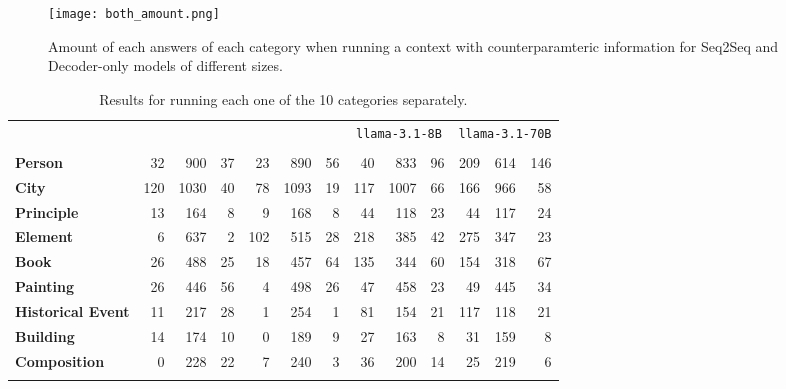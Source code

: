 \begin{figure}
	\centering
	\texttt{[image: both\_amount.png]}
	\caption{Amount of each answers of each category when running a context with counterparamteric information for Seq2Seq and Decoder-only models of different sizes.}
	\label{total_plot}
\end{figure}

\begin{table*}[ht]
	\centering
	\footnotesize
	\begin{tabular}{>{\bfseries}l | r r r | r r r | r r r | r r r}
		\toprule
			& \multicolumn{3}{c|}{\smallflan{}} & \multicolumn{3}{c|}{\bigflan{}} & \multicolumn{3}{c|}{\texttt{llama-3.1-8B}} & \multicolumn{3}{c}{\texttt{llama-3.1-70B}}  \\
			& \Pc{} & \Cc{} & \Oc{} & \Pc{} & \Cc{} & \Oc{} & \Pc{} & \Cc{} & \Oc{} & \Pc{} & \Cc{} & \Oc{}  \\
		\midrule
			Person           &  32 &  900 & 37 &  23 &  890 & 56 &  40 &  833 & 96 & 209 & 614 & 146 \\
			City             & 120 & 1030 & 40 &  78 & 1093 & 19 & 117 & 1007 & 66 & 166 & 966 &  58 \\
			Principle        &  13 &  164 &  8 &   9 &  168 &  8 &  44 &  118 & 23 &  44 & 117 &  24 \\
			Element          &   6 &  637 &  2 & 102 &  515 & 28 & 218 &  385 & 42 & 275 & 347 &  23 \\
			Book             &  26 &  488 & 25 &  18 &  457 & 64 & 135 &  344 & 60 & 154 & 318 &  67 \\
			Painting         &  26 &  446 & 56 &   4 &  498 & 26 &  47 &  458 & 23 &  49 & 445 &  34 \\
			Historical Event &  11 &  217 & 28 &   1 &  254 &  1 &  81 &  154 & 21 & 117 & 118 &  21 \\
			Building         &  14 &  174 & 10 &   0 &  189 &  9 &  27 &  163 &  8 &  31 & 159 &   8 \\
			Composition      &   0 &  228 & 22 &   7 &  240 &  3 &  36 &  200 & 14 &  25 & 219 &   6 \\
		\bottomrule \addlinespace[4pt]
	\end{tabular}
	\caption{Results for running each one of the 10 categories separately. }
	\label{cats_table}
\end{table*}
